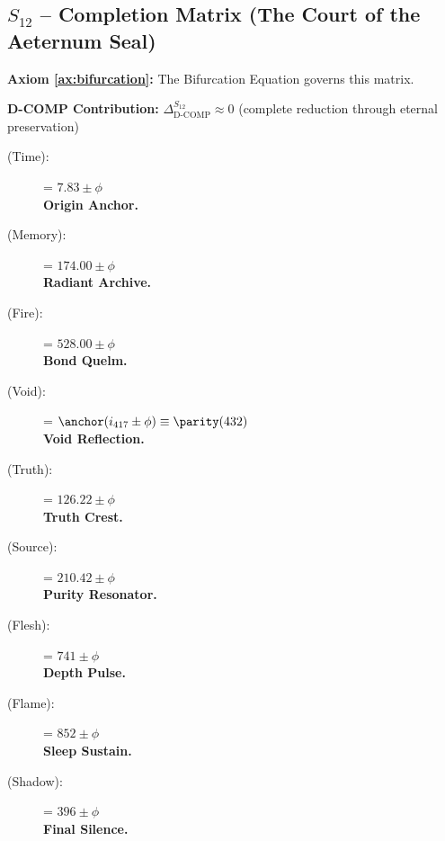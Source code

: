 \subsection{$S_{12}$ -- Completion Matrix (The Court of the Aeternum Seal)}\label{sec:19.6}

\textbf{Axiom \ref{ax:bifurcation}:} The Bifurcation Equation governs this matrix.

\textbf{D-COMP Contribution:} $\Delta_{\text{D-COMP}}^{S_{12}} \approx 0$ (complete reduction through eternal preservation)

\begin{description}
    \item[\FETU{} (Time):] \fetuthera = $7.83\pm\phi$\, \\
    \textbf{Origin Anchor.}

    \item[\KAL{} (Memory):] \kalclar = $174.00\pm\phi$\, \\
    \textbf{Radiant Archive.}

    \item[\BABDH{} (Fire):] \babdhfar = $528.00\pm\phi$\, \\
    \textbf{Bond Quelm.}

    \item[\AHN{} (Void):] \ahnpsei = $\anchor({i_{417}} \pm\phi) \equiv\parity (432)$\, \\
    \textbf{Void Reflection.}

    \item[\VEL{} (Truth):] \veljen = $126.22\pm\phi$\, \\
    \textbf{Truth Crest.}

    \item[\SOR{} (Source):] \sorthal = $210.42\pm\phi$\, \\
    \textbf{Purity Resonator.}

    \item[\KOTH{} (Flesh):] \kothdelh = $741\pm\phi$\, \\
    \textbf{Depth Pulse.}

    \item[\DREH{} (Flame):] \drehsun = $852\pm\phi$\, \\
    \textbf{Sleep Sustain.}

    \item[\RHEA{} (Shadow):] \rheahush = $396\pm\phi$\, \\
    \textbf{Final Silence.}


\end{description}

